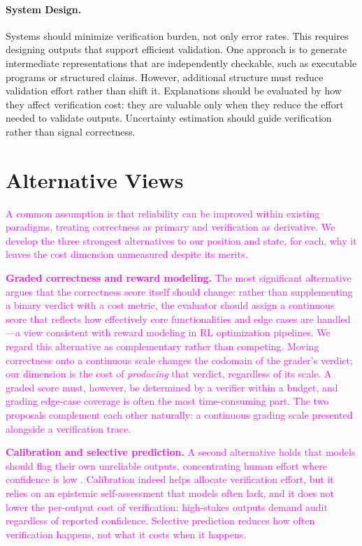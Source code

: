 \documentclass[11pt]{article}
\newcommand{\rev}[1]{\textcolor{magenta}{#1}}
\newcommand{\rev}[1]{#1}
\begin{document}
\paragraph{System Design.} Systems should minimize verification burden, not only error rates. This requires designing outputs that support efficient validation. One approach is to generate intermediate representations that are independently checkable, such as executable programs or structured claims.
However, additional structure must reduce validation effort rather than shift it.
Explanations should be evaluated by how they affect verification cost: they are valuable only when they reduce the effort needed to validate outputs.
Uncertainty estimation should guide verification rather than signal correctness.


\section{Alternative Views}
\label{sec:alternative}

\rev{A common assumption is that reliability can be improved within existing paradigms, treating correctness as primary and verification as derivative. We develop the three strongest alternatives to our position and state, for each, why it leaves the cost dimension unmeasured despite its merits.}

\rev{\textbf{Graded correctness and reward modeling.} The most significant alternative argues that the correctness score itself should change: rather than supplementing a binary verdict with a cost metric, the evaluator should assign a continuous score that reflects how effectively core functionalities and edge cases are handled---a view consistent with reward modeling in RL optimization pipelines. We regard this alternative as complementary rather than competing. Moving correctness onto a continuous scale changes the codomain of the grader's verdict; our dimension is the cost of \emph{producing} that verdict, regardless of its scale. A graded score must, however, be determined by a verifier within a budget, and grading edge-case coverage is often the most time-consuming part. The two proposals complement each other naturally: a continuous grading scale presented alongside a verification trace.}

\rev{\textbf{Calibration and selective prediction.} A second alternative holds that models should flag their own unreliable outputs, concentrating human effort where confidence is low \citep{jiang2021calibration,yin2023selfaware}. Calibration indeed helps allocate verification effort, but it relies on an epistemic self-assessment that models often lack, and it does not lower the per-output cost of verification: high-stakes outputs demand audit regardless of reported confidence. Selective prediction reduces how often verification happens, not what it costs when it happens.}
\end{document}
